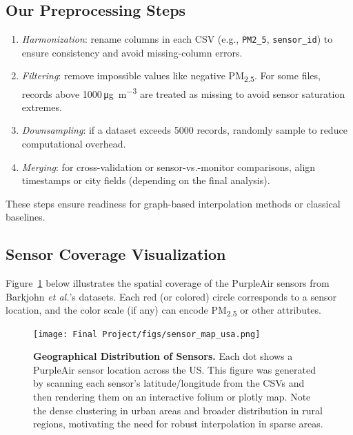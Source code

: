 \documentclass[12pt]{article}                                %
\begin{document}
\subsection{Our Preprocessing Steps}   %
\begin{enumerate}
    \item \textit{Harmonization}: rename columns in each CSV (e.g., \texttt{PM2\_5}, 
    \texttt{sensor\_id}) to ensure consistency and avoid missing-column errors.
    \item \textit{Filtering}: remove impossible values like negative PM\textsubscript{2.5}. For 
    some files, records above 1000\,\si{\micro\gram\per\cubic\meter} are treated as missing 
    to avoid sensor saturation extremes.
    \item \textit{Downsampling}: if a dataset exceeds 5000 records, randomly sample to reduce 
    computational overhead.
    \item \textit{Merging}: for cross-validation or sensor-vs.-monitor comparisons, align 
    timestamps or city fields (depending on the final analysis).
\end{enumerate}

These steps ensure readiness for graph-based interpolation methods or classical baselines.

\subsection{Sensor Coverage Visualization}

Figure~\ref{fig:coverageMap} below illustrates the spatial coverage of the PurpleAir sensors from Barkjohn \emph{et al.}'s datasets. Each red (or colored) circle corresponds to a sensor location, and the color scale (if any) can encode PM\textsubscript{2.5} or other attributes. 

\begin{figure}[H]   %
    \centering
    \texttt{[image: Final Project/figs/sensor\_map\_usa.png]}
    \caption{\textbf{Geographical Distribution of Sensors.} Each dot shows a PurpleAir sensor location across the US. 
    This figure was generated by scanning each sensor's latitude/longitude from the CSVs and then rendering them on an interactive folium or plotly map. Note the dense clustering in urban areas and broader distribution in rural regions, motivating the need for robust interpolation in sparse areas.}
    \label{fig:coverageMap}
\end{figure}
\end{document}
